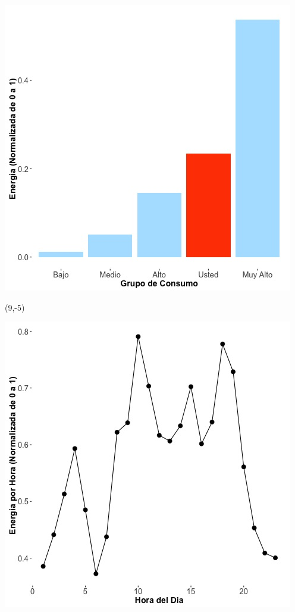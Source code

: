 \documentclass{article}\usepackage[]{graphicx}\usepackage[]{color}
\newenvironment{knitrout}{}{} %
\begin{document}
\begin{knitrout}
\color{fgcolor}
\includegraphics[scale=0.65]{figure/A24_neighbor_plot} 
\end{knitrout}

 \begin{textblock}{1}(9,-5)
\begin{minipage}{20em}
\begingroup

\endgroup
\end{minipage}
\end{textblock}


\begin{knitrout}
\color{fgcolor}
\includegraphics[scale=0.65]{figure/A24_plot_norm_median} 
\end{knitrout}
\end{document}
